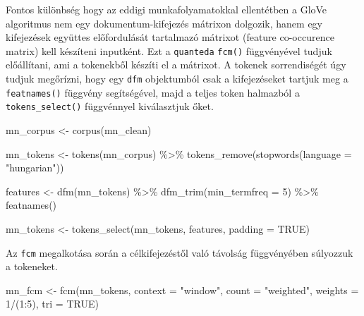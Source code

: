 \documentclass[
]{book}
\newenvironment{Shaded}{\begin{snugshade}}{\end{snugshade}}
\newcommand{\AttributeTok}[1]{\textcolor[rgb]{0.77,0.63,0.00}{#1}}
\newcommand{\ConstantTok}[1]{\textcolor[rgb]{0.00,0.00,0.00}{#1}}
\newcommand{\DecValTok}[1]{\textcolor[rgb]{0.00,0.00,0.81}{#1}}
\newcommand{\FunctionTok}[1]{\textcolor[rgb]{0.00,0.00,0.00}{#1}}
\newcommand{\NormalTok}[1]{#1}
\newcommand{\OtherTok}[1]{\textcolor[rgb]{0.56,0.35,0.01}{#1}}
\newcommand{\SpecialCharTok}[1]{\textcolor[rgb]{0.00,0.00,0.00}{#1}}
\newcommand{\StringTok}[1]{\textcolor[rgb]{0.31,0.60,0.02}{#1}}
\begin{document}
Fontos különbség hogy az eddigi munkafolyamatokkal ellentétben a GloVe
algoritmus nem egy dokumentum-kifejezés mátrixon dolgozik, hanem egy
kifejezések együttes előfordulását tartalmazó mátrixot (feature
co-occurence matrix) kell készíteni inputként. Ezt a \texttt{quanteda}
\texttt{fcm()} függvényével tudjuk előállítani, ami a tokenekből készíti
el a mátrixot. A tokenek sorrendiségét úgy tudjuk megőrízni, hogy egy
\texttt{dfm} objektumból csak a kifejezéseket tartjuk meg a
\texttt{featnames()} függvény segítségével, majd a teljes token
halmazból a \texttt{tokens\_select()} függvénnyel kiválasztjuk őket.

\begin{Shaded}
\begin{Highlighting}[]
\NormalTok{mn\_corpus }\OtherTok{\textless{}{-}} \FunctionTok{corpus}\NormalTok{(mn\_clean)}

\NormalTok{mn\_tokens }\OtherTok{\textless{}{-}} \FunctionTok{tokens}\NormalTok{(mn\_corpus) }\SpecialCharTok{\%\textgreater{}\%}
  \FunctionTok{tokens\_remove}\NormalTok{(}\FunctionTok{stopwords}\NormalTok{(}\AttributeTok{language =} \StringTok{"hungarian"}\NormalTok{))}

\NormalTok{features }\OtherTok{\textless{}{-}} \FunctionTok{dfm}\NormalTok{(mn\_tokens) }\SpecialCharTok{\%\textgreater{}\%}
  \FunctionTok{dfm\_trim}\NormalTok{(}\AttributeTok{min\_termfreq =} \DecValTok{5}\NormalTok{) }\SpecialCharTok{\%\textgreater{}\%}
  \FunctionTok{featnames}\NormalTok{()}

\NormalTok{mn\_tokens }\OtherTok{\textless{}{-}} \FunctionTok{tokens\_select}\NormalTok{(mn\_tokens, features, }\AttributeTok{padding =} \ConstantTok{TRUE}\NormalTok{)}
\end{Highlighting}
\end{Shaded}

Az \texttt{fcm} megalkotása során a célkifejezéstől való távolság
függvényében súlyozzuk a tokeneket.

\begin{Shaded}
\begin{Highlighting}[]
\NormalTok{mn\_fcm }\OtherTok{\textless{}{-}} \FunctionTok{fcm}\NormalTok{(mn\_tokens, }\AttributeTok{context =} \StringTok{"window"}\NormalTok{, }\AttributeTok{count =} \StringTok{"weighted"}\NormalTok{, }\AttributeTok{weights =} \DecValTok{1}\SpecialCharTok{/}\NormalTok{(}\DecValTok{1}\SpecialCharTok{:}\DecValTok{5}\NormalTok{), }
    \AttributeTok{tri =} \ConstantTok{TRUE}\NormalTok{)}
\end{Highlighting}
\end{Shaded}
\end{document}
